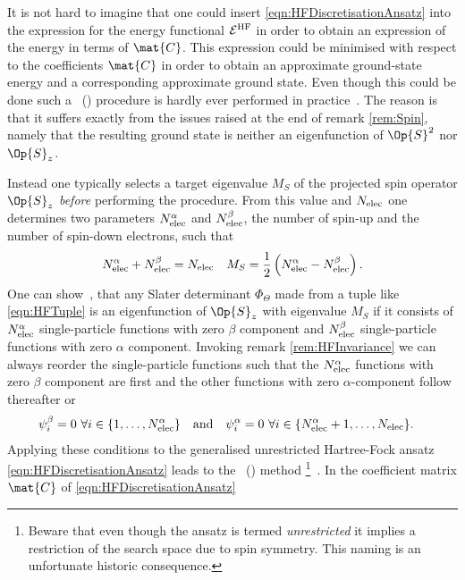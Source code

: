 \begin{rem}
	It is not hard to imagine
	that one could insert \eqref{eqn:HFDiscretisationAnsatz}
	into the expression for the \HF energy functional $\mathcal{E}^\text{HF}$
	in order to obtain an expression of the \HF energy
	in terms of $\mat{C}$.
	This expression could be minimised
	with respect to the coefficients $\mat{C}$
	in order to obtain an approximate
	\HF ground-state energy and a corresponding approximate \HF ground state.
	Even though this could be done
	such a ~(\GUHF)
	procedure is hardly ever performed in practice~\cite{McWeeny1985}.
	The reason is that it suffers
	exactly from the issues raised at the end of remark \vref{rem:Spin},
	namely that the resulting \HF ground state
	is neither an eigenfunction of $\Op{S}^2$ nor $\Op{S}_z$.

	Instead one typically selects a target eigenvalue $M_S$
	of the projected spin operator $\Op{S}_z$ \emph{before}
	performing the \HF procedure.
	From this value and $N_\text{elec}$ one determines two parameters
	$N_\text{elec}^\alpha$ and $N_\text{elec}^\beta$,
	the number of spin-up and the number of spin-down electrons,
	such that
	\begin{align*}
		N_\text{elec}^\alpha + N_\text{elec}^\beta &= N_\text{elec} & M_S = \frac12 \left( N_\text{elec}^\alpha - N_\text{elec}^\beta\right).
	\end{align*}
	One can show~\cite{Szabo1996,Helgaker2013},
	that any Slater determinant $\Phi_\Theta$
	made from a tuple like \eqref{eqn:HFTuple}
	is an eigenfunction of $\Op{S}_z$ with eigenvalue $M_S$
	if it consists of $N_\text{elec}^\alpha$ single-particle functions with zero $\beta$
	component and $N_\text{elec}^\beta$ single-particle functions with zero $\alpha$ component.
	Invoking remark \vref{rem:HFInvariance}
	we can always reorder the single-particle functions
	such that the $N_\text{elec}^\alpha$ functions with zero $\beta$ component are first
	and the other functions with zero $\alpha$-component follow thereafter
	or
	\begin{align*}
		\psi_i^\beta  &= 0 \ \forall i \in \{1,\ldots,N_\text{elec}^\alpha\}
		&&\text{and}&
		\psi_i^\alpha  &= 0 \ \forall i \in \{N_\text{elec}^\alpha+1,\ldots,N_\text{elec}\}.
	\end{align*}
	Applying these conditions
	to the generalised unrestricted Hartree-Fock ansatz \eqref{eqn:HFDiscretisationAnsatz}
	leads to the ~(\UHF) method%
	\footnote{
		Beware that even though the \UHF ansatz is termed \emph{unrestricted}
		it implies a restriction of the search space due to spin symmetry.
		This naming is an unfortunate historic consequence.
	}~\cite{Pople1954}.
	In \UHF the coefficient matrix $\mat{C}$ of \eqref{eqn:HFDiscretisationAnsatz}

\end{rem}
